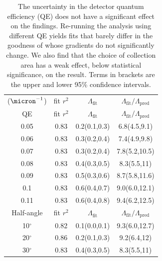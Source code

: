 
	\begin{table}[b]
		\begin{tabular}{c c c c}
			\hline\hline
	($\micron^{-1}$) & fit $r^2$ &  $\Lambda_\textrm{fit}$ & $\Lambda_\textrm{fit}/\Lambda_\textrm{pred}$\\  
			QE & fit $r^2$ &  $\Lambda_\textrm{fit}$ & $\Lambda_\textrm{fit}/\Lambda_\textrm{pred}$\\      
			\hline
			0.05    &   0.83   &   0.2(0.1,0.3)  &  6.8(4.5,9.1)\\
			0.06    &   0.83   &   0.3(0.2,0.4)  &  7.4(4.9,9.8)\\
			0.07    &   0.83   &   0.3(0.2,0.4)  &  7.8(5.2,10.5)\\
			0.08    &   0.83   &   0.4(0.3,0.5)  &  8.3(5.5,11)\\
			0.09    &   0.83   &   0.5(0.3,0.6)  &  8.7(5.8,11.6)\\
			0.1     &   0.83   &   0.6(0.4,0.7)  &  9.0(6.0,12.1)\\
			0.11    &   0.83   &   0.6(0.4,0.8)  &  9.4(6.2,12.5)\\
			\hline
			Half-angle & fit $r^2$ &  $\Lambda_\textrm{fit}$ & $\Lambda_\textrm{fit}/\Lambda_\textrm{pred}$\\
			\hline
			10$^\circ$    &   0.82   &   0.1(0.0,0.1) &  9.3(6.0,12.7)\\
			20$^\circ$    &   0.86   &   0.2(0.1,0.3) &  9.2(6.4,12)\\
			30$^\circ$    &   0.83   &   0.4(0.3,0.5) &  8.3(5.5,11)\\
			\hline\hline
		\end{tabular}
		\caption{The uncertainty in the detector quantum efficiency (QE) does not have a significant effect on the findings.
	Re-running the analysis using different QE yields fits that barely differ in the goodness of whose gradients do not significantly change.
	We also find that the choice of collection area has a weak effect, below statistical significance, on the result.
	Terms in brackets are the upper and lower 95\% confidence intervals.}
		\label{tab:choice_indep}
	\end{table}

